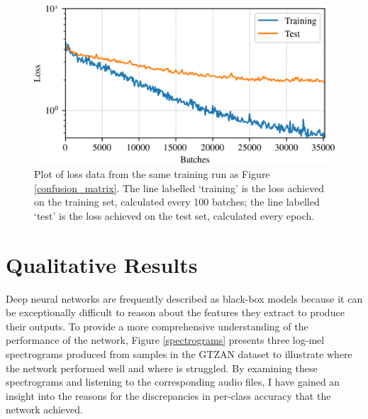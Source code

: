 \documentclass[conference]{IEEEtran}
\begin{document}
\begin{figure}[htbp]
    \centerline{\includegraphics[width=\columnwidth]{loss.png}}
    \caption{
        Plot of loss data from the same training run as Figure \ref{confusion_matrix}.
        The line labelled `training' is the loss achieved on the training set, calculated every 100 batches; the line labelled `test' is the loss achieved on the test set, calculated every epoch.
    }
    \label{loss_curves}
\end{figure}

\section{Qualitative Results}

Deep neural networks are frequently described as black-box models because it can be exceptionally difficult to reason about the features they extract to produce their outputs.
To provide a more comprehensive understanding of the performance of the network, Figure \ref{spectrograms} presents three log-mel spectrograms produced from samples in the GTZAN dataset to illustrate where the network performed well and where is struggled.
By examining these spectrograms and listening to the corresponding audio files, I have gained an insight into the reasons for the discrepancies in per-class accuracy that the network achieved.
\end{document}
